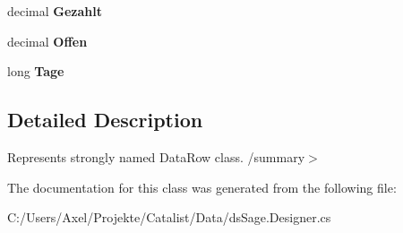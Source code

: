 \begin{DoxyCompactItemize}
\item 
decimal {\bfseries Gezahlt}\hypertarget{class_products_1_1_data_1_1ds_sage_1_1_offene_posten_row_adcbc2ab9a57670024fb78980646f8292}{}\label{class_products_1_1_data_1_1ds_sage_1_1_offene_posten_row_adcbc2ab9a57670024fb78980646f8292}

\item 
decimal {\bfseries Offen}\hypertarget{class_products_1_1_data_1_1ds_sage_1_1_offene_posten_row_af1774654b998ef7c561ee21b0e7b2b15}{}\label{class_products_1_1_data_1_1ds_sage_1_1_offene_posten_row_af1774654b998ef7c561ee21b0e7b2b15}

\item 
long {\bfseries Tage}\hypertarget{class_products_1_1_data_1_1ds_sage_1_1_offene_posten_row_aa3c809861dbfe3528dc5c7bd5a1932b1}{}\label{class_products_1_1_data_1_1ds_sage_1_1_offene_posten_row_aa3c809861dbfe3528dc5c7bd5a1932b1}

\end{DoxyCompactItemize}


\subsection{Detailed Description}
Represents strongly named Data\+Row class. /summary$>$ 

The documentation for this class was generated from the following file\+:\begin{DoxyCompactItemize}
\item 
C\+:/\+Users/\+Axel/\+Projekte/\+Catalist/\+Data/ds\+Sage.\+Designer.\+cs\end{DoxyCompactItemize}
